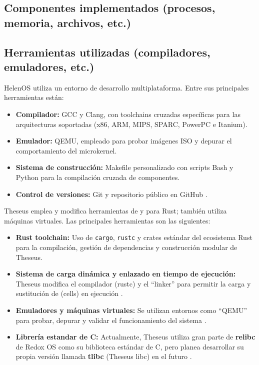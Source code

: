 \subsection{Componentes implementados (procesos, memoria, archivos, etc.)}

\subsection{Herramientas utilizadas (compiladores, emuladores, etc.)}
HelenOS utiliza un entorno de desarrollo multiplataforma. Entre sus principales herramientas están:
\begin{itemize}
    \item \textbf{Compilador:} GCC y Clang, con toolchains cruzadas específicas para las arquitecturas soportadas (x86, ARM, MIPS, SPARC, PowerPC e Itanium).
    \item \textbf{Emulador:} QEMU, empleado para probar imágenes ISO y depurar el comportamiento del microkernel.
    \item \textbf{Sistema de construcción:} Makefile personalizado con scripts Bash y Python para la compilación cruzada de componentes.
    \item \textbf{Control de versiones:} Git y repositorio público en GitHub \citep{helenos_GitHub}.
\end{itemize}

Theseus emplea y modifica herramientas de y para Rust; también utiliza máquinas virtuales. Las principales herramientas son las siguientes:
\begin{itemize}
    \item \textbf{Rust toolchain:} Uso de \texttt{cargo}, \texttt{rustc} y crates estándar del ecosistema Rust para la compilación, gestión de dependencias y construcción modular de Theseus.
    \item \textbf{Sistema de carga dinámica y enlazado en tiempo de ejecución:} Theseus modifica el compilador (rustc) y el “linker” para permitir la carga y sustitución de (cells) en ejecución \citep{boos2017theseus}.
    \item \textbf{Emuladores y máquinas virtuales:} Se utilizan entornos como “QEMU” para probar, depurar y validar el funcionamiento del sistema \citep{theseus_GitHub}.
    \item \textbf{Librería estandar de C:} Actualmente, Theseus utiliza gran parte de \textbf{relibc} de Redox OS como su biblioteca estándar de C, pero planea desarrollar su propia versión llamada \textbf{tlibc} (Theseus libc) en el futuro \citep{theseus_GitHub}.
\end{itemize}

